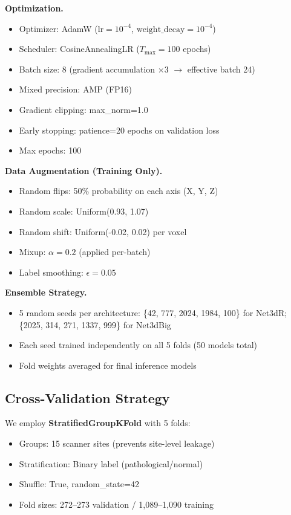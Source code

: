 \noindent\textbf{Optimization.}
\begin{itemize}
    \item Optimizer: AdamW ($\text{lr}=10^{-4}$, $\text{weight\_decay}=10^{-4}$)
    \item Scheduler: CosineAnnealingLR ($T_{\text{max}}=100$ epochs)
    \item Batch size: 8 (gradient accumulation $\times$3 $\to$ effective batch 24)
    \item Mixed precision: AMP (FP16)
    \item Gradient clipping: max\_norm=1.0
    \item Early stopping: patience=20 epochs on validation loss
    \item Max epochs: 100
\end{itemize}

\noindent\textbf{Data Augmentation (Training Only).}
\begin{itemize}
    \item Random flips: 50\% probability on each axis (X, Y, Z)
    \item Random scale: Uniform(0.93, 1.07)
    \item Random shift: Uniform(-0.02, 0.02) per voxel
    \item Mixup: $\alpha=0.2$ (applied per-batch)
    \item Label smoothing: $\epsilon=0.05$
\end{itemize}

\noindent\textbf{Ensemble Strategy.}
\begin{itemize}
    \item 5 random seeds per architecture: \{42, 777, 2024, 1984, 100\} for Net3dR; \{2025, 314, 271, 1337, 999\} for Net3dBig
    \item Each seed trained independently on all 5 folds (50 models total)
    \item Fold weights averaged for final inference models
\end{itemize}

\subsection{Cross-Validation Strategy}
\label{sec:cv}
We employ \textbf{StratifiedGroupKFold} with 5 folds:
\begin{itemize}
    \item Groups: 15 scanner sites (prevents site-level leakage)
    \item Stratification: Binary label (pathological/normal)
    \item Shuffle: True, random\_state=42
    \item Fold sizes: 272--273 validation / 1,089--1,090 training
\end{itemize}

